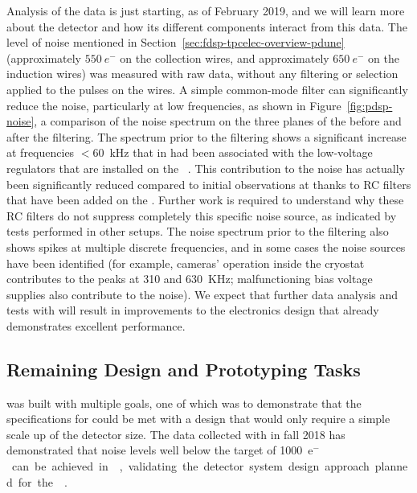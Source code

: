 Analysis of the  data is just starting, as of February 2019, and 
we will learn more about the detector and how its different components interact
from this data. The level of noise mentioned in Section~\ref{sec:fdsp-tpcelec-overview-pdune}
(approximately $\SI{550}{e^-}$ on the collection wires,
and approximately $\SI{650}{e^-}$ on the induction wires) 
was measured with raw data, without any
filtering or selection applied to the pulses on the 
wires. A simple common-mode filter can significantly reduce the 
noise, particularly at low frequencies, as shown in Figure~\ref{fig:pdsp-noise},  
a comparison of the noise spectrum on the three planes of the  
before and after the filtering. The spectrum prior to the filtering shows 
a significant increase at frequencies $<$\SI{60}{kHz} that in  
had been associated with the low-voltage regulators that are installed
on the ~\cite{Acciarri:2017sde}. This contribution to the noise 
has actually been significantly reduced compared to initial observations at 
 thanks to RC filters that have been added
on the  . Further work is required to
understand why these RC filters do not suppress completely this
specific noise source, as indicated by tests performed in other setups.
The noise spectrum prior to the filtering also shows spikes at multiple 
discrete frequencies, and in some cases the noise sources have been 
identified (for example, cameras' operation inside the cryostat
contributes to the peaks at \num{310} and \SI{630}{KHz};
malfunctioning bias voltage supplies also contribute to the noise). We 
expect that further data analysis and tests with  
will result in improvements to the  electronics design that 
already demonstrates excellent performance.

\subsection{Remaining Design and Prototyping Tasks}
\label{sec:fdsp-tpcelec-overview-remaining}

  was %
 built with multiple
goals, one of which was to demonstrate that the specifications
for  could be met with a design that would only require a simple
scale up of the detector size. The data collected with 
in fall 2018 has demonstrated that noise levels well below the target
of \SI{1000}{e$^-$} can be achieved in \lar, validating the
detector system design approach planned for the  .


